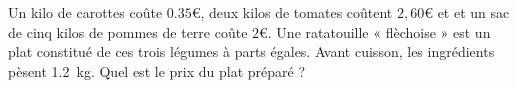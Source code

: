 
\begin{exercice}\label{exo2smath-0250}

    Un kilo de carottes coûte $0.35$€, deux kilos de tomates coûtent $2,60$€ et et un sac de cinq kilos de pommes de terre coûte $2$€.  Une ratatouille « flèchoise » est un plat constitué de ces trois légumes à parts égales. Avant cuisson, les ingrédients pèsent \SI{1.2}{\kilo\gram}. Quel est le prix du plat préparé ?

\end{exercice}
